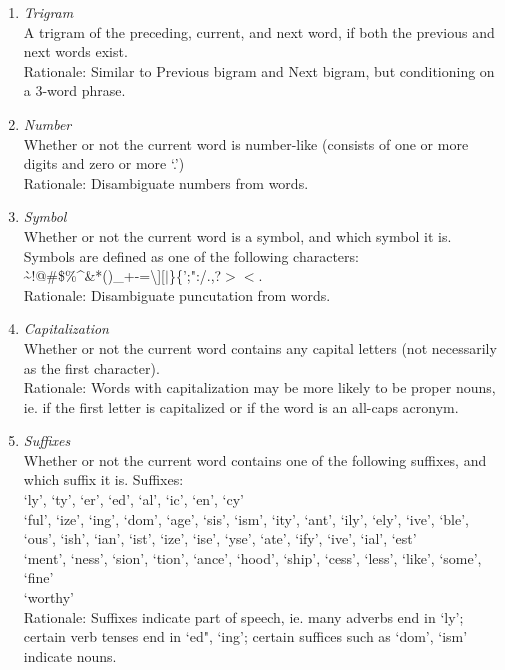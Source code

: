\documentclass[11pt]{exam}
\theoremstyle{quest}
\begin{document}
\begin{enumerate}
\begin{enumerate}
		\item \textit{Trigram} \\
		A trigram of the preceding, current, and next word, if both the previous and next words exist. \\
		Rationale: Similar to Previous bigram and Next bigram, but conditioning on a 3-word phrase. 
		
		\item \textit{Number} \\
		Whether or not the current word is number-like (consists of one or more digits and zero or more `.') \\
		Rationale: Disambiguate numbers from words. 
		
		\item \textit{Symbol} \\
		Whether or not the current word is a symbol, and which symbol it is. Symbols are defined as one of the following characters: \\
		\`\textasciitilde!@\#\$\%\textasciicircum\&*()\_+-=\textbackslash][$|$\}\{';":/.,?$><$. \\
		Rationale: Disambiguate puncutation from words.
		
		\item \textit{Capitalization} \\
		Whether or not the current word contains any capital letters (not necessarily as the first character). \\
		Rationale: Words with capitalization may be more likely to be proper nouns, ie. if the first letter is capitalized or if the word is an all-caps acronym.
		
		\item \textit{Suffixes} \\
		Whether or not the current word contains one of the following suffixes, and which suffix it is. Suffixes: \\
		`ly', `ty', `er', `ed', `al', `ic', `en', `cy' \\
		`ful', `ize', `ing', `dom', `age', `sis', `ism', `ity', `ant', `ily', `ely', `ive', `ble', `ous', `ish', `ian', `ist', `ize', 		`ise', `yse', `ate', `ify', `ive', `ial', `est' \\
		`ment', `ness', `sion', `tion', `ance', `hood', `ship', `cess', `less', `like', `some', `fine' \\
		`worthy' \\
	Rationale: Suffixes indicate part of speech, ie. many adverbs end in `ly'; certain verb tenses end in `ed", `ing'; certain suffices such as `dom', `ism' indicate nouns. 
		

\end{enumerate}
\end{enumerate}
\end{document}
